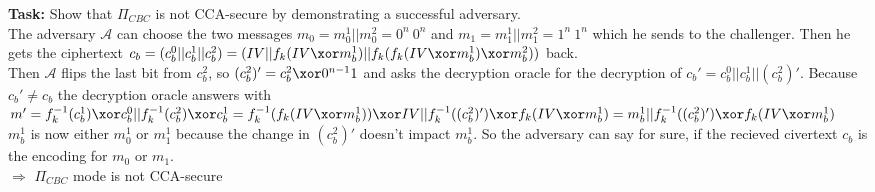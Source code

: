 \textbf{Task:} Show that \(\Pi_{CBC}\) is not CCA-secure by demonstrating a successful adversary. \\

The adversary  \(\mathcal{A}\) can choose the two messages \(m_{0}  = m_0^1 \vert \vert m_0^2 = 0^n\ 0^n\) and  \(m_{1}  = m_1^1 \vert \vert m_1^2 = 1^n\ 1^n\) which he sends to the challenger. Then he gets the ciphertext \(c_b = (c_b^0 \vert \vert c_b^1 \vert \vert c_b^2) = (IV \vert \vert f_k(IV \xor m_b^1) \vert \vert  f_k( f_k(IV \xor m_b^1) \xor m_b^2))\) back.\\

Then \(\mathcal{A}\) flips the last bit from \(c_b^2\), so \((c_b^2)' = c_b^2 \xor 0^{n-1}1\) and asks the decryption oracle for the decryption of \(c_b' = c_b^0 \vert \vert c_b^1 \vert \vert (c_b^2)'\). Because \(c_b' \neq c_b\) the decryption oracle answers with \(m' = f_k^{-1}(c_b^1) \xor c_b^0 \vert \vert f_k^{-1}(c_b^2) \xor c_b^1  = f_k^{-1}(f_k(IV \xor m_b^1)) \xor IV \vert \vert f_k^{-1}((c_b^2)') \xor f_k(IV \xor m_b^1) = m_b^1 \vert \vert f_k^{-1}((c_b^2)') \xor f_k(IV \xor m_b^1)\) \\

\(m_b^1\) is now either \(m_0^1\) or \(m_1^1\) because the change in \((c_b^2)'\) doesn't impact \(m_b^1\). So the adversary can say for sure, if the recieved civertext \(c_b\) is the encoding for \(m_0\) or \(m_1\). \\

\(\Rightarrow\) \(\Pi_{CBC}\) mode is not CCA-secure \\
  